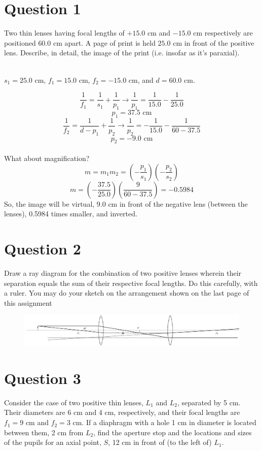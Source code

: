 \documentclass[a4paper]{article}
\begin{document}
\section*{Question 1}
Two thin lenses having focal lengths of $+15.0$ cm and $-15.0$ cm respectively are positioned $60.0$ cm
apart. A page of print is held $25.0$ cm in front of the positive lens. Describe, in detail, the image of the
print (i.e. insofar as it’s paraxial). \\\\

\begin{center}
    $s_1 = 25.0$ cm, $f_1 = 15.0$ cm, $f_2 = -15.0$ cm, and $d = 60.0$ cm.
\end{center}
$$ \frac{1}{f_1} = \frac{1}{s_1} + \frac{1}{p_1} \rightarrow  \frac{1}{p_1} = \frac{1}{15.0} - \frac{1}{25.0}$$
$$ p_1 = 37.5 \textrm{ cm}$$
$$ \frac{1}{f_2} = \frac{1}{d - p_1} + \frac{1}{p_2} \rightarrow  \frac{1}{p_2} = -\frac{1}{15.0} - \frac{1}{60 - 37.5}$$
$$ p_2 = -9.0 \textrm{ cm}$$\\
What about magnification?
$$ m = m_1 m_2 = \left( - \frac{p_1}{s_1}\right) \left( - \frac{p_2}{s_2}\right)$$
$$ m = \left(-\frac{37.5}{25.0}\right) \left(\frac{9}{60-37.5}\right) = -0.5984$$
So, the image will be virtual, 9.0 cm in front of the negative lens (between the lenses), 0.5984 times smaller, and inverted.

\newpage
\section*{Question 2}
Draw a ray diagram for the combination of two positive lenses wherein their separation equals the
sum of their respective focal lengths. Do this carefully, with a ruler. You may do your sketch on the
arrangement shown on the last page of this assignment

\begin{figure}[htb!]
    \centering
    \includegraphics[angle=90]{hw2q2.pdf}
\end{figure}

\section*{Question 3}
Consider the case of two positive thin lenses, $L_1$ and $L_2$, separated by 5 cm. Their diameters are
6 cm and 4 cm, respectively, and their focal lengths are $f_1 = 9$ cm and $f_2 = 3$ cm. If a diaphragm with a
hole 1 cm in diameter is located between them, 2 cm from $L_2$, find the aperture stop and the locations
and sizes of the pupils for an axial point, $S$, 12 cm in front of (to the left of) $L_1$.\\\\
\end{document}
